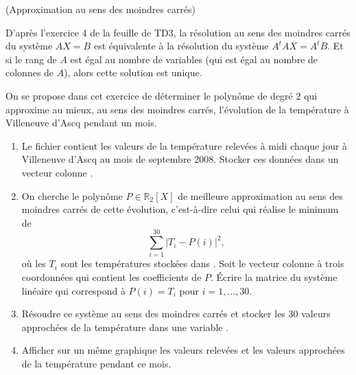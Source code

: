 \documentclass[a4paper,12pt,reqno]{amsart}
\begin{document}
\begin{exo} (Approximation au sens des moindres carrés)

  D'après l'exercice 4 de la feuille de TD3, la résolution au sens des moindres carrés du système $AX=B$ est équivalente à la résolution du système $A^{t}AX=A^{t}B$. Et si le rang de $A$ est égal au nombre de variables (qui est égal au nombre de colonnes de $A$), alors cette solution est unique.

  On se propose dans cet exercice de déterminer le polynôme de degré $2$ qui approxime au mieux, au sens des moindres carrés, l'évolution de la température à Villeneuve d'Ascq pendant un mois.

  \begin{enumerate}
    \item Le fichier  contient les valeurs de la température relevées à midi chaque jour à Villeneuve d’Ascq au mois de septembre 2008. Stocker ces données dans un vecteur colonne .

    \item On cherche le polynôme $P \in \mathbb{R}_{2}[X]$ de meilleure approximation au sens des moindres carrés de cette évolution, c'est-à-dire celui qui réalise le minimum de
    $$
      \sum_{i=1}^{30} |T_{i}-P(i)|^2,
    $$
    où les $T_{i}$ sont les températures stockées dans .
    Soit  le vecteur colonne à trois coordonnées qui contient les coefficients de $P$.
    Écrire la matrice  du système linéaire  qui correspond à $P(i)=T_{i}$ pour $i=1,\ldots,30$.

    \item Résoudre ce système au sens des moindres carrés et stocker les $30$ valeurs approchées de la température dans une variable .

    \item Afficher sur un même graphique les valeurs relevées et les valeurs approchées de la température pendant ce mois.
  \end{enumerate}

\end{exo}
\end{document}
